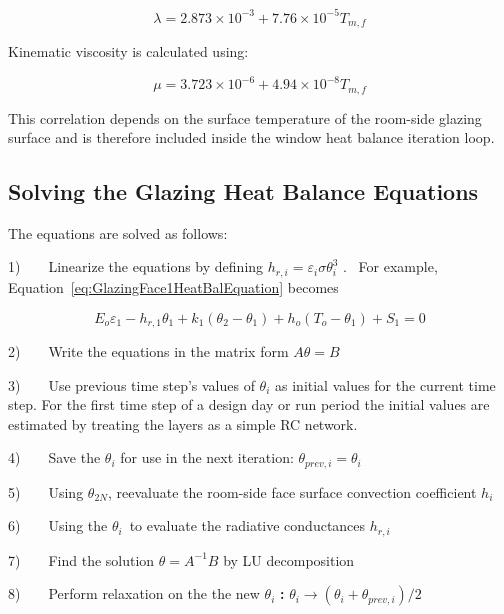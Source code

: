 \begin{equation}
\lambda = 2.873 \times {10^{ - 3}} + 7.76 \times {10^{ - 5}}{T_{m,f}}
\end{equation}

Kinematic viscosity is calculated using:

\begin{equation}
\mu = 3.723 \times {10^{ - 6}} + 4.94 \times {10^{ - 8}}{T_{m,f}}
\end{equation}

This correlation depends on the surface temperature of the room-side glazing surface and is therefore included inside the window heat balance iteration loop.

\subsection{Solving the Glazing Heat Balance Equations}\label{solving-the-glazing-heat-balance-equations}

The equations are solved as follows:

1)~~~~Linearize the equations by defining \({h_{r,i}} = {\varepsilon_i}\sigma \theta_i^3\) .~ For example, Equation~\ref{eq:GlazingFace1HeatBalEquation} becomes

\begin{equation}
{E_o}{\varepsilon_1} - {h_{r,1}}{\theta_1} + {k_1}\left( {{\theta_2} - {\theta_1}} \right) + {h_o}\left( {{T_o} - {\theta_1}} \right) + {S_1} = 0
\end{equation}

2)~~~~Write the equations in the matrix form \(A\theta = B\)

3)~~~~Use previous time step's values of \({\theta_i}\) as initial values for the current time step. For the first time step of a design day or run period the initial values are estimated by treating the layers as a simple RC network.

4)~~~~Save the \({\theta_i}\) for use in the next iteration: \({\theta_{prev,i}} = {\theta_i}\)

5)~~~~Using \({\theta_{2N}}\), reevaluate the room-side face surface convection coefficient \({h_i}\)

6)~~~~Using the \({\theta_i}\)~to evaluate the radiative conductances \({h_{r,i}}\)

7)~~~~Find the solution \(\theta = {A^{ - 1}}B\) by LU decomposition

8)~~~~Perform relaxation on the the new \({\theta_i}\) \textbf{:} \({\theta_i} \to \left( {{\theta_i} + {\theta_{prev,i}}} \right)/2\)

